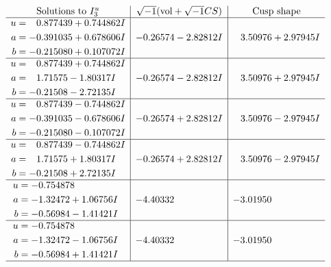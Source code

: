 \documentclass[1p]{elsarticle_modified}
\theoremstyle{definition}
\newcommand{\I}{\sqrt{-1}}
\begin{document}
$$\begin{array}{c|c|c}  
\text{Solutions to }I^u_{3}& \I (\text{vol} + \sqrt{-1}CS) & \text{Cusp shape}\\
 \hline 
\begin{aligned}
u &= \phantom{-}0.877439 + 0.744862 I \\
a &= -0.391035 + 0.678606 I \\
b &= -0.215080 + 0.107072 I\end{aligned}
 & -0.26574 - 2.82812 I & \phantom{-}3.50976 + 2.97945 I \\ \hline\begin{aligned}
u &= \phantom{-}0.877439 + 0.744862 I \\
a &= \phantom{-}1.71575 - 1.80317 I \\
b &= -0.21508 - 2.72135 I\end{aligned}
 & -0.26574 - 2.82812 I & \phantom{-}3.50976 + 2.97945 I \\ \hline\begin{aligned}
u &= \phantom{-}0.877439 - 0.744862 I \\
a &= -0.391035 - 0.678606 I \\
b &= -0.215080 - 0.107072 I\end{aligned}
 & -0.26574 + 2.82812 I & \phantom{-}3.50976 - 2.97945 I \\ \hline\begin{aligned}
u &= \phantom{-}0.877439 - 0.744862 I \\
a &= \phantom{-}1.71575 + 1.80317 I \\
b &= -0.21508 + 2.72135 I\end{aligned}
 & -0.26574 + 2.82812 I & \phantom{-}3.50976 - 2.97945 I \\ \hline\begin{aligned}
u &= -0.754878\phantom{ +0.000000I} \\
a &= -1.32472 + 1.06756 I \\
b &= -0.56984 - 1.41421 I\end{aligned}
 & -4.40332\phantom{ +0.000000I} & -3.01950\phantom{ +0.000000I} \\ \hline\begin{aligned}
u &= -0.754878\phantom{ +0.000000I} \\
a &= -1.32472 - 1.06756 I \\
b &= -0.56984 + 1.41421 I\end{aligned}
 & -4.40332\phantom{ +0.000000I} & -3.01950\phantom{ +0.000000I}\\
 \hline 
 \end{array}$$\newpage
\end{document}
